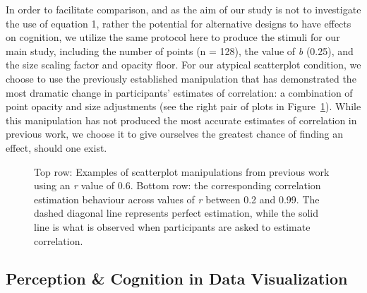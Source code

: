 \documentclass[manuscript,screen,review,anonymous]{acmart}
\begin{document}
In order to facilitate comparison, and as the aim of our study is not to
investigate the use of equation 1, rather the potential for alternative
designs to have effects on cognition, we utilize the same protocol here
to produce the stimuli for our main study, including the number of
points (n = 128), the value of \emph{b} (0.25), and the size scaling
factor and opacity floor. For our atypical scatterplot condition, we
choose to use the previously established manipulation that has
demonstrated the most dramatic change in participants' estimates of
correlation: a combination of point opacity and size adjustments
\citep{strain_2024} (see the right pair of plots in
Figure~\ref{fig-previous-manipulations}). While this manipulation has
not produced the most accurate estimates of correlation in previous
work, we choose it to give ourselves the greatest chance of finding an
effect, should one exist.

\begin{figure}


\caption{\label{fig-previous-manipulations}Top row: Examples of
scatterplot manipulations from previous work using an \textit{r} value
of 0.6. Bottom row: the corresponding correlation estimation behaviour
across values of \textit{r} between 0.2 and 0.99. The dashed diagonal
line represents perfect estimation, while the solid line is what is
observed when participants are asked to estimate correlation.}

\end{figure}%

\subsection{Perception \& Cognition in Data
Visualization}\label{sec-perception-cognition}
\end{document}
